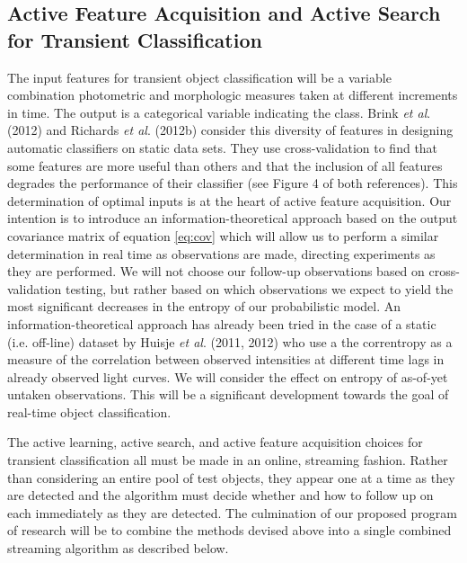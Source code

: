 \documentclass[useAMS,usenatbib,tightenlines,11pt,preprint]{aastex}
\begin{document}
\subsection{Active Feature Acquisition and Active Search
for Transient Classification}

The input features for transient object classification will be 
a variable combination photometric
and morphologic measures taken at different increments in time.  The output
is a categorical variable indicating the class.
Brink {\it et al}. (2012) and Richards {\it et al}. (2012b) consider this
diversity of features in designing automatic classifiers on static data sets. 
They use cross-validation to
find that some features are more useful than others and that the inclusion
of all features degrades the performance of their classifier (see Figure 4 of
both references).  This
determination of optimal inputs is at the heart of active feature
acquisition.  Our
intention is to introduce an information-theoretical approach 
based on the output covariance matrix of equation \ref{eq:cov} which will allow
us to perform a similar determination in real time as observations are made,
directing experiments as they are performed.
We will not choose our follow-up observations based on cross-validation testing,
but rather based on which observations we expect to yield the most significant
decreases in the entropy of our probabilistic model.
An information-theoretical
approach has already been tried in the case of a static (i.e. off-line)
dataset by Huisje {\it et al}. 
(2011, 2012) who use a the correntropy as a measure of the
correlation between observed intensities at different time lags in already
observed light curves.  We will consider the effect on entropy of as-of-yet
untaken observations.  This will be a significant development towards the goal
of real-time object classification.

The active learning, active search, and active feature
acquisition choices for transient classification
all must be made in an online, streaming fashion.  
Rather than
considering an entire pool of test objects, they appear one at a time as
they are detected and the algorithm must decide whether and how to follow
up on each immediately as they are detected.  The culmination of our proposed
program of research will be to combine the methods devised above into a single
combined streaming algorithm as described below.
\end{document}
